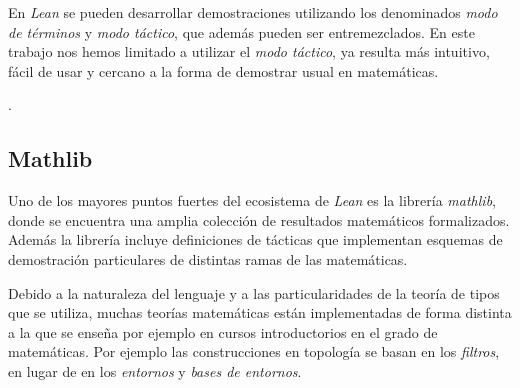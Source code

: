 En \textit{Lean} se pueden desarrollar demostraciones utilizando los denominados
\textit{modo de términos} y \textit{modo táctico}, que además pueden ser
entremezclados. En este trabajo nos hemos limitado a utilizar el  \textit{modo
	táctico}, ya resulta más intuitivo, fácil de usar y cercano a la forma de
demostrar usual en matemáticas.

.

\subsection{Mathlib}

Uno de los mayores puntos fuertes del ecosistema de \textit{Lean} es la librería
\textit{mathlib}, donde se encuentra una amplia colección de resultados
matemáticos formalizados. Además la librería incluye definiciones de tácticas
que implementan esquemas de demostración particulares de distintas ramas de las
matemáticas.

Debido a la naturaleza del lenguaje y a las particularidades de la teoría de
tipos que se utiliza, muchas teorías matemáticas están implementadas de forma
distinta a la que se enseña por ejemplo en cursos introductorios en el grado de
matemáticas. Por ejemplo las construcciones en  topología se basan en los
\textit{filtros}, en lugar de en los \textit{entornos} y \textit{bases de
	entornos}.


